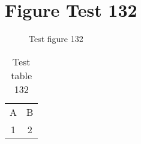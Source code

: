 \documentclass{article}
\begin{document}
\section{Figure Test 132}
\begin{figure}[h]
\caption{Test figure 132}
\end{figure}
\begin{table}[h]
\caption{Test table 132}
\begin{tabular}{cc}
A & B \\
1 & 2
\end{tabular}
\end{table}
\end{document}

